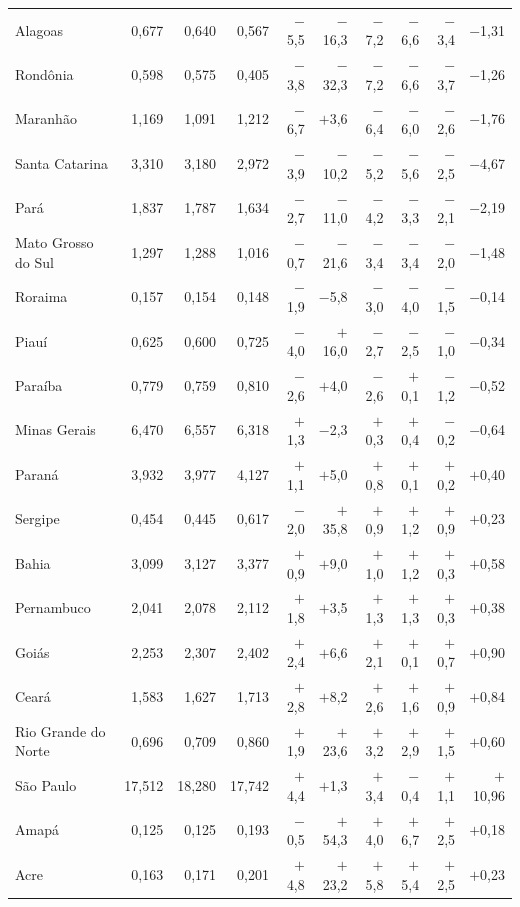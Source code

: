 \begin{longtable}{@{}>{\raggedright\arraybackslash}p{3.0cm}*{9}{r}@{}}
Alagoas & 0,677 & 0,640 & 0,567 & $-$5,5 & $-$16,3 & $-$7,2 & $-$6,6 & $-$3,4 & $-$1,31 \\
Rondônia & 0,598 & 0,575 & 0,405 & $-$3,8 & $-$32,3 & $-$7,2 & $-$6,6 & $-$3,7 & $-$1,26 \\
Maranhão & 1,169 & 1,091 & 1,212 & $-$6,7 & $+$3,6 & $-$6,4 & $-$6,0 & $-$2,6 & $-$1,76 \\
Santa Catarina & 3,310 & 3,180 & 2,972 & $-$3,9 & $-$10,2 & $-$5,2 & $-$5,6 & $-$2,5 & $-$4,67 \\
Pará & 1,837 & 1,787 & 1,634 & $-$2,7 & $-$11,0 & $-$4,2 & $-$3,3 & $-$2,1 & $-$2,19 \\
Mato Grosso do Sul & 1,297 & 1,288 & 1,016 & $-$0,7 & $-$21,6 & $-$3,4 & $-$3,4 & $-$2,0 & $-$1,48 \\
Roraima & 0,157 & 0,154 & 0,148 & $-$1,9 & $-$5,8 & $-$3,0 & $-$4,0 & $-$1,5 & $-$0,14 \\
Piauí & 0,625 & 0,600 & 0,725 & $-$4,0 & $+$16,0 & $-$2,7 & $-$2,5 & $-$1,0 & $-$0,34 \\
Paraíba & 0,779 & 0,759 & 0,810 & $-$2,6 & $+$4,0 & $-$2,6 & $+$0,1 & $-$1,2 & $-$0,52 \\
Minas Gerais & 6,470 & 6,557 & 6,318 & $+$1,3 & $-$2,3 & $+$0,3 & $+$0,4 & $-$0,2 & $-$0,64 \\
Paraná & 3,932 & 3,977 & 4,127 & $+$1,1 & $+$5,0 & $+$0,8 & $+$0,1 & $+$0,2 & $+$0,40 \\
Sergipe & 0,454 & 0,445 & 0,617 & $-$2,0 & $+$35,8 & $+$0,9 & $+$1,2 & $+$0,9 & $+$0,23 \\
Bahia & 3,099 & 3,127 & 3,377 & $+$0,9 & $+$9,0 & $+$1,0 & $+$1,2 & $+$0,3 & $+$0,58 \\
Pernambuco & 2,041 & 2,078 & 2,112 & $+$1,8 & $+$3,5 & $+$1,3 & $+$1,3 & $+$0,3 & $+$0,38 \\
Goiás & 2,253 & 2,307 & 2,402 & $+$2,4 & $+$6,6 & $+$2,1 & $+$0,1 & $+$0,7 & $+$0,90 \\
Ceará & 1,583 & 1,627 & 1,713 & $+$2,8 & $+$8,2 & $+$2,6 & $+$1,6 & $+$0,9 & $+$0,84 \\
Rio Grande do Norte & 0,696 & 0,709 & 0,860 & $+$1,9 & $+$23,6 & $+$3,2 & $+$2,9 & $+$1,5 & $+$0,60 \\
São Paulo & 17,512 & 18,280 & 17,742 & $+$4,4 & $+$1,3 & $+$3,4 & $-$0,4 & $+$1,1 & $+$10,96 \\
Amapá & 0,125 & 0,125 & 0,193 & $-$0,5 & $+$54,3 & $+$4,0 & $+$6,7 & $+$2,5 & $+$0,18 \\
Acre & 0,163 & 0,171 & 0,201 & $+$4,8 & $+$23,2 & $+$5,8 & $+$5,4 & $+$2,5 & $+$0,23 \\

\end{longtable}
